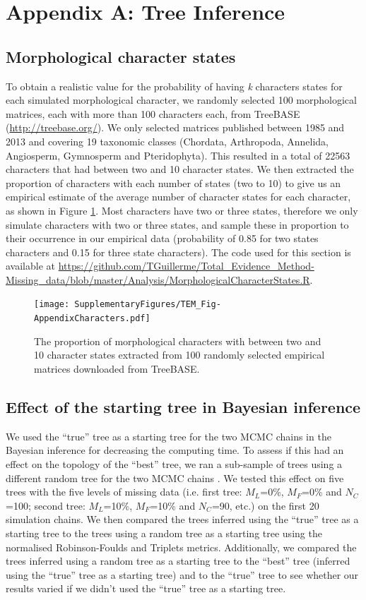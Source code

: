 \documentclass[12pt,letterpaper]{article}
\begin{document}
\section{Appendix A: Tree Inference}

\subsection{Morphological character states}
To obtain a realistic value for the probability of having \textit{k} characters states for each simulated morphological character, we randomly selected 100 morphological matrices, each with more than 100 characters each, from TreeBASE (\url{http://treebase.org/}). We only selected matrices published between 1985 and 2013 and covering 19 taxonomic classes (Chordata, Arthropoda, Annelida, Angiosperm, Gymnosperm and Pteridophyta). This resulted in a total of 22563 characters that had between two and 10 character states. We then extracted the proportion of characters with each number of states (two to 10) to give us an empirical estimate of the average number of character states for each character, as shown in Figure \ref{Fig_AppendixCharacters}. Most characters have two or three states, therefore we only simulate characters with two or three states, and sample these in proportion to their occurrence in our empirical data (probability of 0.85 for two states characters and 0.15 for three state characters). The code used for this section is available at \url{https://github.com/TGuillerme/Total_Evidence_Method-Missing_data/blob/master/Analysis/MorphologicalCharacterStates.R}.

\begin{figure}
\centering
\texttt{[image: SupplementaryFigures/TEM\_Fig-AppendixCharacters.pdf]}
\caption{The proportion of morphological characters with between two and 10 character states extracted from 100 randomly selected empirical matrices downloaded from TreeBASE.}
\label{Fig_AppendixCharacters}
\end{figure}

\subsection{Effect of the starting tree in Bayesian inference}
We used the ``true'' tree as a starting tree for the two MCMC chains in the Bayesian inference for decreasing the computing time.
To assess if this had an effect on the topology of the ``best'' tree, we ran a sub-sample of trees using a different random tree for the two MCMC chains \citep[default MrBayes option;][]{Ronquist2012mrbayes}.
We tested this effect on five trees with the five levels of missing data (i.e. first tree: $M_L$=0\%, $M_F$=0\% and $N_C$=100; second tree: $M_L$=10\%, $M_F$=10\% and $N_C$=90, etc.) on the first 20 simulation chains.
We then compared the trees inferred using the ``true'' tree as a starting tree to the trees using a random tree as a starting tree using the normalised Robinson-Foulds and Triplets metrics.
Additionally, we compared the trees inferred using a random tree as a starting tree to the ``best'' tree (inferred using the ``true'' tree as a starting tree) and to the ``true'' tree to see whether our results varied if we didn't used the ``true'' tree as a starting tree.
\end{document}
